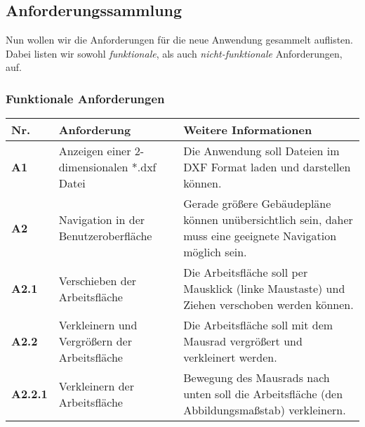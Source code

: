 \subsection{Anforderungssammlung}
\label{subsec:requirements}

Nun wollen wir die Anforderungen für die neue Anwendung gesammelt auflisten.
Dabei listen wir sowohl \textit{funktionale}, als auch \textit{nicht-funktionale} Anforderungen, auf.

\vspace{8pt}

\subsubsection{Funktionale Anforderungen}
\label{subsubsec:functional-requirements}

\begin{center}
    \begin{supertabular}{ p{1cm}|p{3cm}|p{4cm} }
        Nr.             & Anforderung                                   & Weitere Informationen                                                                                                                                                                            \\
        \hline
        \textbf{A1}     & Anzeigen einer 2-dimensionalen *.dxf Datei    & Die Anwendung soll Dateien im DXF Format laden und darstellen können.                                                                                                                            \\
        \textbf{A2}     & Navigation in der Benutzeroberfläche          & Gerade größere Gebäudepläne können unübersichtlich sein, daher muss eine geeignete Navigation möglich sein.                                                                                      \\
        \textbf{A2.1}   & Verschieben der Arbeitsfläche                 & Die Arbeitsfläche soll per Mausklick (linke Maustaste) und Ziehen verschoben werden können.                                                                                                      \\
        \textbf{A2.2}   & Verkleinern und Vergrößern der Arbeitsfläche  & Die Arbeitsfläche soll mit dem Mausrad vergrößert und verkleinert werden.                                                                                                                        \\
        \textbf{A2.2.1} & Verkleinern der Arbeitsfläche                 & Bewegung des Mausrads nach unten soll die Arbeitsfläche (den Abbildungsmaßstab) verkleinern.                                                                                                     \\

\end{supertabular}
\end{center}
